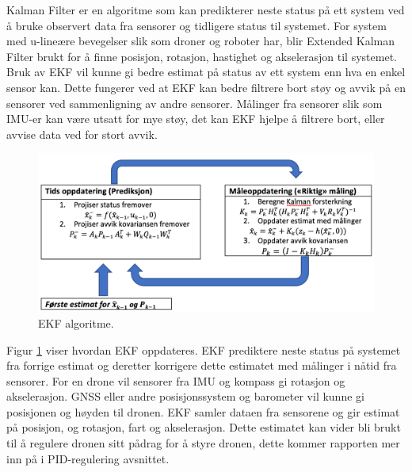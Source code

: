 Kalman Filter er en algoritme som kan predikterer neste status på ett system ved å bruke observert data fra 
sensorer og tidligere status til systemet. For system med u-lineære bevegelser slik som droner og roboter har, 
blir Extended Kalman Filter brukt for å finne posisjon, rotasjon, hastighet og akselerasjon til systemet. 
Bruk av EKF vil kunne gi bedre estimat på status av ett system enn hva en enkel sensor kan. Dette fungerer ved at 
EKF kan bedre filtrere bort støy og avvik på en sensorer ved sammenligning av andre sensorer. 
Målinger fra sensorer slik som IMU-er kan være utsatt for mye støy, det kan EKF hjelpe å filtrere bort, 
eller avvise data ved for stort avvik. 

\begin{figure}[htp]
    \centering
    \includegraphics[width=1\columnwidth]{figures/ekf}
    \caption{EKF algoritme.}
    \label{fig:ekf}
\end{figure}

Figur \ref{fig:ekf} viser hvordan EKF oppdateres. EKF prediktere neste status på systemet fra forrige estimat og 
deretter korrigere dette estimatet med målinger i nåtid fra sensorer. For en drone vil sensorer fra IMU og kompass 
gi rotasjon og akselerasjon. GNSS eller andre posisjonssystem og barometer vil kunne gi posisjonen og høyden til dronen. 
EKF samler dataen fra sensorene og gir estimat på posisjon, og rotasjon, fart og akselerasjon. 
Dette estimatet kan vider bli brukt til å regulere dronen sitt pådrag for å styre dronen, 
dette kommer rapporten mer inn på i PID-regulering avsnittet. \parencite{ArdupilotDevTeam}
